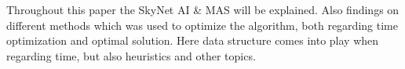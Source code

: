 \documentclass[Main]{subfiles}
\begin{document}
Throughout this paper the SkyNet AI \& MAS will be explained. Also findings on different methods which was used to optimize the algorithm, both regarding time optimization and optimal solution. Here data structure comes into play when regarding time, but also heuristics and other topics. 
\end{document}
